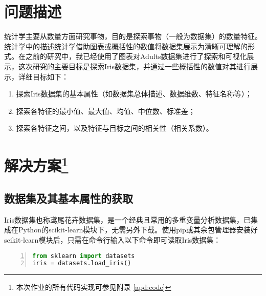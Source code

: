 \documentclass[12pt,a4paper]{article}
\theoremstyle{definition}
\begin{document}
\noindent
\noindent{}

\section{问题描述}

统计学主要从数量方面研究事物，目的是探索事物（一般为数据集）的数量特征。统计学中的描述统计学借助图表或概括性的数值将数据集展示为清晰可理解的形式。在之前的研究中，我已经使用了图表对Adults数据集进行了探索和可视化展示，这次研究的主要目标是探索Iris数据集，并通过一些概括性的数值对其进行展示，详细目标如下：

\begin{enumerate}
	\item 探索Iris数据集的基本属性（如数据集总体描述、数据维数、特征名称等）；
	
	\item 探索各特征的最小值、最大值、均值、中位数、标准差；
	
	\item 探索各特征之间，以及特征与目标之间的相关性（相关系数）。
\end{enumerate}

\section{解决方案\protect\footnote{本次作业的所有代码实现可参见附录 \ref{apd:code}}}

\subsection{数据集及其基本属性的获取}
\label{sec:app_basic}

Iris数据集也称鸢尾花卉数据集，是一个经典且常用的多重变量分析数据集，已集成在Python的scikit-learn模块下，无需另外下载。使用pip或其余包管理器安装好scikit-learn模块后，只需在命令行输入以下命令即可读取Iris数据集：
\vspace{0.01\linewidth}

\begin{lstlisting}[language=Python,
numbers=left,
keywordstyle=\color{blue!70},
frame=shadowbox,
breaklines=True]
from sklearn import datasets
iris = datasets.load_iris()
\end{lstlisting}
\end{document}
